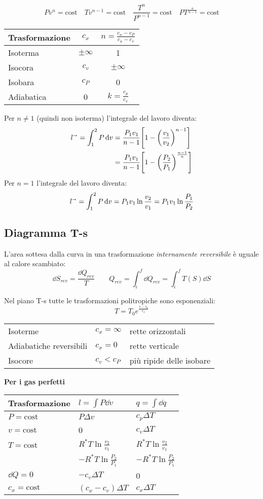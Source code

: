 \[
    Pv^n = \text{cost} \quad Tv^{n-1} = \text{cost} \quad \frac{T^n}{P^{n-1}} = \text{cost} \quad PT^{\frac{n}{n-1}} = \text{cost}
\]

\begin{tabular}{lcc}
    \toprule
    Trasformazione & $c_x$ & $n = \frac{c_x-c_P}{c_x-c_v}$ \\
    \midrule
    Isoterma & $\pm\infty$ & 1 \\
    Isocora & $c_v$ & $\pm\infty$ \\
    Isobara & $c_P$ & 0 \\
    Adiabatica & 0 & $k = \frac{c_p}{c_v}$ \\
    \bottomrule
\end{tabular}

Per $n \ne 1$ (quindi non isoterma) l'integrale del lavoro diventa:
\begin{align*}
    l^\shortrightarrow = \int_1^2 P\dd{v} &= \frac{P_1v_1}{n-1} \qty[1-\qty(\frac{v_1}{v_2})^{n-1}] \\
    &= \frac{P_1v_1}{n-1} \qty[1-\qty(\frac{P_2}{P_1})^{\frac{n-1}{n}}]
\end{align*}
Per $n = 1$ l'integrale del lavoro diventa:
\[ l^\shortrightarrow = \int_1^2 P\dd{v} = P_1v_1\ln{\frac{v_2}{v_1}} = P_1v_1\ln{\frac{P_1}{P_2}} \]

\subsection{Diagramma T-s}

L'area sottesa dalla curva in una trasformazione \emph{internamente reversibile} è uguale al calore scambiato:
\[ \dd{S}_{rev} = \frac{\dd{Q}_{rev}}{T} \qquad Q_{rev} = \int_i^f \dd{Q}_{rev} = \int_i^f T(S) \dd{S} \]

Nel piano T-s tutte le trasformazioni politropiche sono esponenziali:
\[T = T_0 e ^ { \frac{s-s_0}{c_x} }\]

\begin{tabular}{lll}
    Isoterme & $c_x = \infty$ & rette orizzontali \\
    Adiabatiche reversibili & $c_x = 0$ & rette verticale \\
    Isocore & $c_v < c_P$ & più ripide delle isobare \\
\end{tabular}

\textbf{Per i gas perfetti}
\begin{tabular}{lll}
    \toprule
    Trasformazione & $l=\int P\dd{v}$ & $q = \int \dd{q}$ \\
    \midrule
    $P = \text{cost}$ & $P\Delta v$ & $c_p\Delta T$ \\
    $v = \text{cost}$ & 0 & $c_v\Delta T$ \\
    $T = \text{cost}$ & $R^*T\ln{\frac{v_2}{v_1}}$ & $R^*T\ln{\frac{v_2}{v_1}}$ \\
    & $-R^*T\ln{\frac{P_2}{P_1}}$ & $-R^*T\ln{\frac{P_2}{P_1}}$ \\
    $\dd{Q}=0$ & $-c_v\Delta T$ & 0 \\
    $c_x = \text{cost}$ & $(c_x-c_v)\Delta T$ & $c_x\Delta T$ \\
    \bottomrule
\end{tabular}

